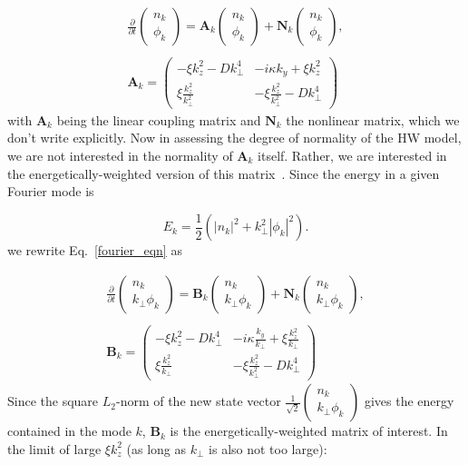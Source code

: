 \documentclass[twocolumn,showkeys,superscriptaddress]{revtex4}
\def\beq{\begin{equation}}
\def\eeq{\end{equation}}
\def\beqar{\begin{eqnarray}}
\def\eeqar{\end{eqnarray}}
\begin{document}
\beqar
\label{fourier_eqn}
\frac{\partial}{\partial t} \left( \begin{array}{cc} n_k \\ \phi_k \end{array} \right) = \mathbf{A}_k \left( \begin{array}{cc} n_k \\ \phi_k \end{array} \right) + \mathbf{N}_k \left( \begin{array}{cc} n_k \\ \phi_k \end{array} \right), \\ \nonumber \\
\label{A_k}
\mathbf{A}_k = \left( \begin{array}{cc} -\xi k_z^2 - D k_\perp^4 & -i \kappa k_y + \xi k_z^2 \\  \xi \frac{k_z^2}{k_\perp^2} & - \xi \frac{k_z^2}{k_\perp^2} - D k_\perp^4\end{array} \right)
\eeqar
with $\mathbf{A}_k$ being the linear coupling matrix and $\mathbf{N}_k$ the nonlinear matrix, which we don't write explicitly. 
Now in assessing the degree of normality of the HW model, we are not interested in the normality of $\mathbf{A}_k$ itself. 
Rather, we are interested in the energetically-weighted version of this matrix~\cite{camargo1998,schmid2007,camporeale2010}. Since the energy in a given Fourier mode is

\beq
\label{en_def}
E_k =  \frac{1}{2} \left( |n_k|^2 + k_\perp^2 |\phi_k|^2 \right).
\eeq
we rewrite Eq.~\ref{fourier_eqn} as

\beqar
\label{fourier_en_eqn}
\frac{\partial}{\partial t} \left( \begin{array}{cc} n_k \\ k_\perp \phi_k \end{array} \right) = \mathbf{B}_k \left( \begin{array}{cc} n_k \\ k_\perp \phi_k \end{array} \right) + \mathbf{N}_k \left( \begin{array}{cc} n_k \\ k_\perp \phi_k \end{array} \right), \\ \nonumber \\
\label{B_k}
\mathbf{B}_k = \left( \begin{array}{cc} -\xi k_z^2 - D k_\perp^4 & -i \kappa \frac{k_y}{k_\perp} + \xi \frac{k_z^2}{k_\perp} \\  \xi \frac{k_z^2}{k_\perp} & - \xi \frac{k_z^2}{k_\perp^2} - D k_\perp^4\end{array} \right)
\eeqar
Since the square $L_2$-norm of the new state vector $\frac{1}{\sqrt{2}} \left( \begin{array}{cc} n_k \\ k_\perp \phi_k \end{array} \right)$ gives the energy contained in the mode $k$,
$\mathbf{B}_k$ is the energetically-weighted matrix of interest. In the limit of large $\xi k_z^2$ (as long as $k_\perp$ is also not too large):
\end{document}
